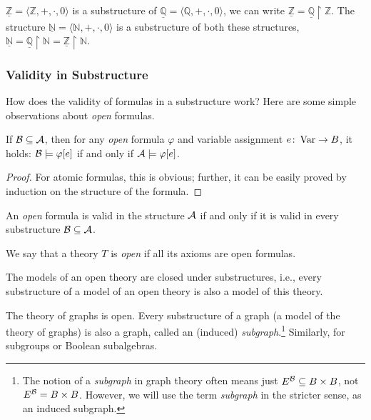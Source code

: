 \begin{example}
    $\underline{\mathbb Z}=\langle\mathbb Z,+,\cdot,0\rangle$ is a substructure of $\underline{\mathbb Q}=\langle\mathbb Q,+,\cdot,0\rangle$, we can write $\underline{\mathbb Z}=\underline{\mathbb Q}\restriction\mathbb Z$. The structure $\underline{\mathbb N}=\langle \mathbb N,+,\cdot,0\rangle$ is a substructure of both these structures, $\underline{\mathbb N}=\underline{\mathbb Q}\restriction\mathbb N=\underline{\mathbb Z}\restriction\mathbb N$.
\end{example}

\subsubsection{Validity in Substructure}

How does the validity of formulas in a substructure work? Here are some simple observations about \emph{open} formulas.

\begin{observation}
    If $\mathcal{B}\subseteq\mathcal{A}$, then for any \emph{open} formula $\varphi$ and variable assignment $e\colon\operatorname{Var}\to B$, it holds: $\mathcal{B}\models\varphi[e]$ if and only if $\mathcal{A}\models\varphi[e]$.
\end{observation}
\begin{proof}
    For atomic formulas, this is obvious; further, it can be easily proved by induction on the structure of the formula.
\end{proof}

\begin{corollary}
    An \emph{open} formula is valid in the structure $\mathcal{A}$ if and only if it is valid in every substructure $\mathcal{B}\subseteq\mathcal{A}$.
\end{corollary}

We say that a theory $T$ is \emph{open} if all its axioms are open formulas.

\begin{corollary}
    The models of an open theory are closed under substructures, i.e., every substructure of a model of an open theory is also a model of this theory.
\end{corollary}

\begin{example}
    The theory of graphs is open. Every substructure of a graph (a model of the theory of graphs) is also a graph, called an (induced) \emph{subgraph}.\footnote{The notion of a \emph{subgraph} in graph theory often means just $E^{\mathcal{B}}\subseteq B\times B$, not $E^{\mathcal{B}}=B\times B$. However, we will use the term \emph{subgraph} in the stricter sense, as an induced subgraph.} Similarly, for subgroups or Boolean subalgebras.
\end{example}


